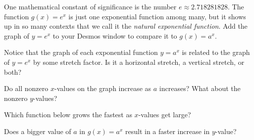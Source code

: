 \documentclass{ximera}
\begin{document}
One mathematical constant of significance is the number $e\approx2.718281828$. The function $g(x)=e^x$ is just one exponential function among many, but it shows up in so many contexts that we call it the \emph{natural exponential function}. Add the graph of $y=e^x$ to your Desmos window to compare it to $g(x)=a^x$.

\begin{question}
Notice that the graph of each exponential function $y=a^x$ is related to the graph of $y=e^x$ by some stretch factor. Is it a horizontal stretch, a vertical stretch, or both? 

    \begin{hint}
      Do all nonzero $x$-values on the graph increase as $a$ increases? What about the nonzero $y$-values?
    \end{hint}
    \begin{multipleChoice}
    \end{multipleChoice}

\end{question}

\begin{question}
Which function below grows the fastest as $x$-values get large?

    \begin{hint}
      Does a bigger value of $a$ in $g(x)=a^x$ result in a faster increase in $y$-value?
    \end{hint}
    \begin{multipleChoice}
    \end{multipleChoice}


\end{question}
\end{document}
